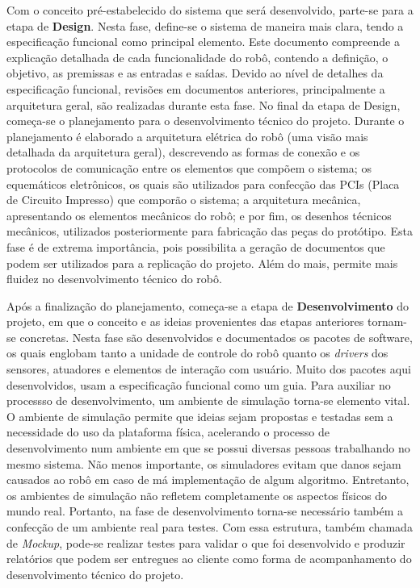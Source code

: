 Com o conceito pré-estabelecido do sistema que será desenvolvido, parte-se para a etapa de \textbf{Design}. Nesta fase, define-se o sistema de maneira mais clara, tendo a especificação funcional como principal elemento. Este documento compreende a explicação  detalhada de cada funcionalidade do robô, contendo a definição, o objetivo, as premissas e as entradas e saídas. Devido ao nível de detalhes da especificação funcional, revisões em documentos anteriores, principalmente a arquitetura geral, são realizadas durante esta fase. No final da etapa de Design, começa-se o planejamento para o desenvolvimento técnico do projeto. Durante o planejamento é elaborado a arquitetura elétrica do robô (uma visão mais detalhada da arquitetura geral), descrevendo as formas de conexão e os protocolos de comunicação entre os elementos que compõem o sistema; os equemáticos eletrônicos, os quais são utilizados para confecção das PCIs (Placa de Circuito Impresso) que comporão o sistema; a arquitetura mecânica, apresentando os elementos mecânicos do robô; e por fim, os desenhos técnicos mecânicos, utilizados posteriormente para fabricação das peças do protótipo. Esta fase é de extrema importância, pois possibilita a geração de documentos que podem ser utilizados para a replicação do projeto. Além do mais, permite mais fluidez no desenvolvimento técnico do robô.

Após a finalização do planejamento, começa-se a etapa de \textbf{Desenvolvimento} do projeto, em que o conceito e as ideias provenientes das etapas anteriores tornam-se concretas. Nesta fase são desenvolvidos e documentados os pacotes de software, os quais englobam tanto a unidade de controle do robô quanto os \textit{drivers} dos sensores, atuadores e elementos de interação com usuário. Muito dos pacotes aqui desenvolvidos, usam a especificação funcional como um guia. Para auxiliar no processso de desenvolvimento, um ambiente de simulação torna-se elemento vital. O ambiente de simulação permite que ideias sejam propostas e testadas sem a necessidade do uso da plataforma física, acelerando o processo de desenvolvimento num ambiente em que se possui diversas pessoas trabalhando no mesmo sistema. Não menos importante, os simuladores evitam que danos sejam causados ao robô em caso de má implementação de algum algoritmo. Entretanto, os ambientes de simulação não refletem completamente os aspectos físicos do mundo real. Portanto, na fase de desenvolvimento torna-se necessário também a confecção de um ambiente real para testes. Com essa estrutura, também chamada de \textit{Mockup}, pode-se realizar testes para validar o que foi desenvolvido e produzir relatórios que podem ser entregues ao cliente  como forma de acompanhamento do desenvolvimento técnico do projeto.

